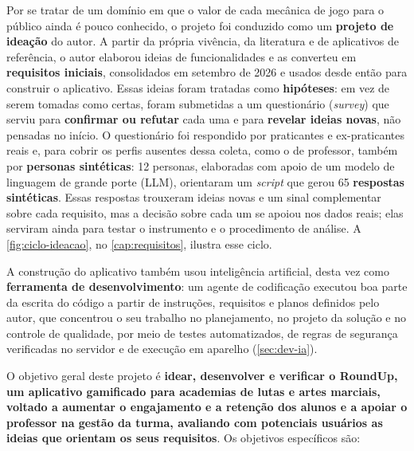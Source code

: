 Por se tratar de um domínio em que o valor de cada mecânica de jogo para
o público ainda é pouco conhecido, o projeto foi conduzido como um
\textbf{projeto de ideação} do autor. A partir da própria vivência, da
literatura e de aplicativos de referência, o autor elaborou ideias de
funcionalidades e as converteu em \textbf{requisitos iniciais},
consolidados em setembro de 2026 e usados desde então para construir o
aplicativo. Essas ideias foram tratadas como \textbf{hipóteses}: em vez
de serem tomadas como certas, foram submetidas a um questionário
(\textit{survey}) que serviu para \textbf{confirmar ou refutar} cada
uma e para \textbf{revelar ideias novas}, não pensadas no início. O
questionário foi respondido por praticantes e ex-praticantes reais e,
para cobrir os perfis ausentes dessa coleta, como o de professor, também
por \textbf{personas sintéticas}: 12 personas, elaboradas com apoio de
um modelo de linguagem de grande porte (LLM), orientaram um
\textit{script} que gerou 65 \textbf{respostas sintéticas}. Essas
respostas trouxeram ideias novas e um sinal complementar sobre cada
requisito, mas a decisão sobre cada um se apoiou nos dados reais; elas
serviram ainda para testar o instrumento e o procedimento de análise. A
\autoref{fig:ciclo-ideacao}, no \autoref{cap:requisitos}, ilustra esse
ciclo.

A construção do aplicativo também usou inteligência artificial, desta vez
como \textbf{ferramenta de desenvolvimento}: um agente de codificação
executou boa parte da escrita do código a partir de instruções,
requisitos e planos definidos pelo autor, que concentrou o seu trabalho no
planejamento, no projeto da solução e no controle de qualidade, por meio
de testes automatizados, de regras de segurança verificadas no servidor e
de execução em aparelho (\autoref{sec:dev-ia}).

O objetivo geral deste projeto é \textbf{idear, desenvolver e verificar
o RoundUp, um aplicativo gamificado para academias de lutas e artes
marciais, voltado a aumentar o engajamento e a retenção dos alunos e a
apoiar o professor na gestão da turma, avaliando com potenciais usuários
as ideias que orientam os seus requisitos}. Os objetivos específicos são:


